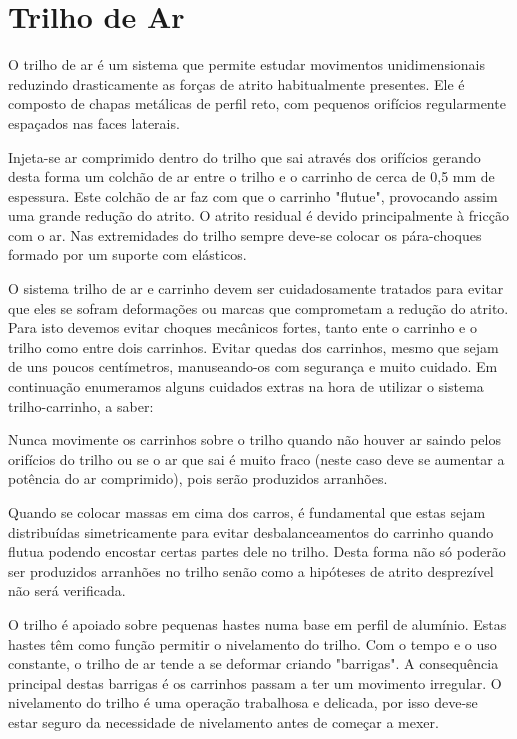 \chapter{Trilho de Ar}\label{trilho}
\vspace{-0.3cm}
O trilho de ar é um sistema que permite estudar movimentos unidimensionais reduzindo drasticamente as forças de atrito habitualmente presentes. Ele é composto de chapas metálicas de perfil reto, com pequenos orifícios regularmente espaçados nas faces  laterais.  

Injeta-se ar comprimido dentro do trilho que sai através dos orifícios gerando desta forma um colchão de ar entre o trilho e o carrinho de cerca de 0,5 mm de espessura. Este colchão de ar faz com que o carrinho "flutue", provocando assim uma grande redução do atrito.  O atrito residual é devido principalmente à fricção com o ar. Nas extremidades do trilho sempre deve-se colocar os pára-choques formado por um suporte com elásticos. 

O sistema trilho de ar e carrinho devem ser cuidadosamente tratados para evitar que eles se sofram deformações ou marcas que comprometam a redução do atrito.  Para isto devemos evitar choques mecânicos fortes, tanto ente o carrinho e o trilho como entre dois carrinhos. Evitar quedas dos carrinhos, mesmo que sejam de uns poucos centímetros, manuseando-os com segurança e muito cuidado. Em continuação enumeramos alguns cuidados extras na hora de utilizar o sistema trilho-carrinho, a saber:
\vspace{-0.3cm}
\begin{iten}

\item Nunca movimente os carrinhos sobre o trilho quando não houver ar saindo pelos orifícios do trilho ou se o ar que sai é muito fraco (neste caso deve se aumentar a potência do ar comprimido), pois serão produzidos arranhões.

\item Quando se colocar massas em cima dos carros, é fundamental que estas sejam distribuídas simetricamente para evitar desbalanceamentos do carrinho quando flutua podendo encostar certas partes dele no trilho.  Desta forma não só poderão ser produzidos arranhões no trilho senão como a hipóteses de atrito desprezível não será verificada. 

\item O trilho é apoiado sobre pequenas hastes numa base em perfil de alumínio. Estas hastes têm como função permitir o nivelamento do trilho. Com o tempo e o uso constante, o trilho de ar tende a se deformar criando "barrigas".  A consequência principal destas barrigas é os carrinhos passam a ter um movimento irregular. O nivelamento do trilho é uma operação trabalhosa e delicada, por isso deve-se estar seguro da necessidade de nivelamento antes de começar a mexer.

\end{iten}